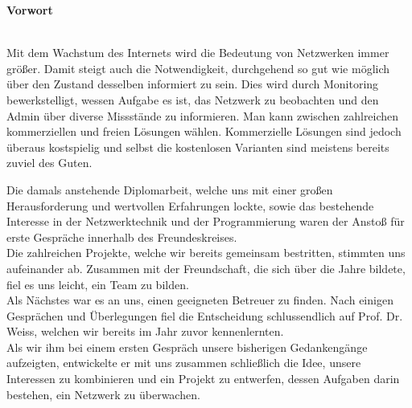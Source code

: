 \documentclass[12pt,a4paper]{report}
\begin{document}

\begin{onehalfspace}

\vspace{1.5cm}
\begin{Huge}
\textbf{Vorwort}
\end{Huge}
\vspace{2cm}
\\Mit dem Wachstum des Internets wird die Bedeutung von Netzwerken immer größer. Damit steigt auch die Notwendigkeit, durchgehend so gut wie möglich über den Zustand desselben informiert zu sein. Dies wird durch Monitoring bewerkstelligt, wessen Aufgabe es ist, das Netzwerk zu beobachten und den Admin über diverse Missstände zu informieren. Man kann zwischen zahlreichen kommerziellen und freien Lösungen wählen. Kommerzielle Lösungen sind jedoch überaus kostspielig und selbst die kostenlosen Varianten sind meistens bereits zuviel des Guten. 

Die damals anstehende Diplomarbeit, welche uns mit einer großen Herausforderung und wertvollen Erfahrungen lockte, sowie das bestehende Interesse in der Netzwerktechnik und der Programmierung waren der Anstoß für erste Gespräche innerhalb des Freundeskreises.\\
Die zahlreichen Projekte, welche wir bereits gemeinsam bestritten, stimmten uns aufeinander ab. Zusammen mit der Freundschaft, die sich über die Jahre bildete, fiel es uns leicht, ein Team zu bilden.\\

Als Nächstes war es an uns, einen geeigneten Betreuer zu finden. Nach einigen Gesprächen und Überlegungen fiel die Entscheidung schlussendlich auf Prof. Dr. Weiss, welchen wir bereits im Jahr zuvor kennenlernten.\\

Als wir ihm bei einem ersten Gespräch unsere bisherigen Gedankengänge aufzeigten, entwickelte er mit uns zusammen schließlich die Idee, unsere Interessen zu kombinieren und ein Projekt zu entwerfen, dessen Aufgaben darin bestehen, ein Netzwerk zu überwachen.
\end{onehalfspace}
\begin{singlespace}
\tableofcontents
\newpage
\end{singlespace}
\pagestyle{fancy}
\end{document}

